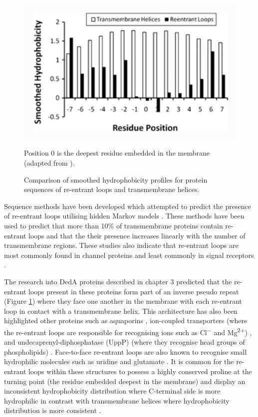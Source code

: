 \begin{figure}[th!]
    \centering
    \includegraphics[width=150mm, scale=0.6]{Pfam/re-ent_hydrop_profile.png}
    \caption{Comparison of smoothed hydrophobicity profiles for protein sequences of re-entrant loops and transmembrane helices.}
    \label{fig:hydrophob}
    \small
    Position 0 is the deepest residue embedded in the membrane (adapted from \cite{Yan2010}).
\end{figure}


Sequence methods have been developed which attempted to predict the presence of re-entrant loops utilising hidden Markov models \cite{Yan2010,viklund2006structural}. These methods have been used to predict that more than 10\% of transmembrane proteins contain re-entrant loops and that the their presence increases linearly with the number of transmembrane regions. These studies also indicate that re-entrant loops are most commonly found in channel proteins and least commonly in signal receptors \cite{viklund2006structural}. 

The research into DedA proteins described in chapter 3 predicted that the re-entrant loops present in these proteins form part of an inverse pseudo repeat (Figure \ref{fig:hydrophob}) where they face one another in the membrane with each re-entrant loop in contact with a transmembrane helix.  This architecture has also been highlighted other proteins such as aquaporins \cite{tornroth2010structural}, ion-coupled transporters (where the re-entrant loops are responsible for recognising ions such as Cl\textsuperscript{−} and Mg\textsuperscript{2+}) \cite{forrest2015structural}, and undecaprenyl-diphosphatase (UppP) (where they recognise head groups of phospholipids) \cite{el2018crystal}.  Face-to-face re-entrant loops are also known to recognise small hydrophilic molecules such as uridine and glutamate \cite{forrest2015structural}.  It is common for the re-entrant loops within these structures to possess a highly conserved proline at the turning point (the residue embedded deepest in the membrane) \cite{mesdaghi2020silico} and display an inconsistent hydrophobicity distribution where C-terminal side is more hydrophilic in contrast with transmembrane helices where hydrophobicity distribution is more consistent \cite{Yan2010}. 


